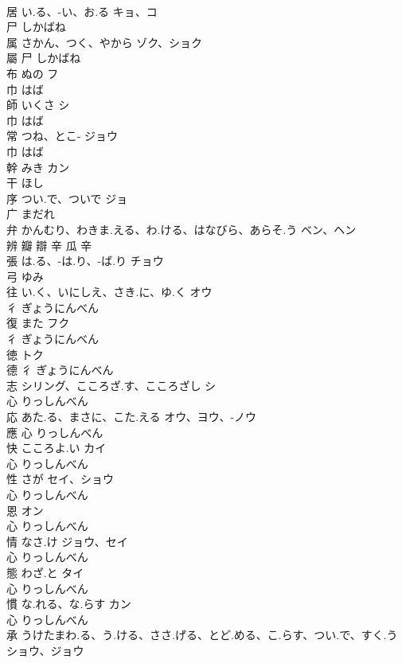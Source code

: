 \documentclass[8pt]{extreport}
\begin{document}
\begin{CJK}{UTF8}{min}
\\	居	い.る、-い、お.る	キョ、コ	
\\	尸		しかばね		
\\	属	さかん、つく、やから	ゾク、ショク	
\\	屬	尸		しかばね		
\\	布	ぬの	フ	
\\	巾		はば		
\\	師	いくさ	シ	
\\	巾		はば		
\\	常	つね、とこ-	ジョウ	
\\	巾		はば		
\\	幹	みき	カン	
\\	干		ほし		
\\	序	つい.で、ついで	ジョ	
\\	广		まだれ		
\\	弁	かんむり、わきま.える、わ.ける、はなびら、あらそ.う	ベン、ヘン	
\\	辨 瓣 辯	辛 瓜 辛				
\\	張	は.る、-は.り、-ば.り	チョウ	
\\	弓		ゆみ		
\\	往	い.く、いにしえ、さき.に、ゆ.く	オウ	
\\	彳		ぎょうにんべん		
\\	復	また	フク	
\\	彳		ぎょうにんべん		
\\	徳		トク	
\\	德	彳		ぎょうにんべん		
\\	志	シリング、こころざ.す、こころざし	シ	
\\	心		りっしんべん		
\\	応	あた.る、まさに、こた.える	オウ、ヨウ、-ノウ	
\\	應	心		りっしんべん		
\\	快	こころよ.い	カイ	
\\	心		りっしんべん		
\\	性	さが	セイ、ショウ	
\\	心		りっしんべん		
\\	恩		オン	
\\	心		りっしんべん		
\\	情	なさ.け	ジョウ、セイ	
\\	心		りっしんべん		
\\	態	わざ.と	タイ	
\\	心		りっしんべん		
\\	慣	な.れる、な.らす	カン	
\\	心		りっしんべん		
\\	承	うけたまわ.る、う.ける、ささ.げる、とど.める、こ.らす、つい.で、すく.う	ショウ、ジョウ	

\end{CJK}
\end{document}
